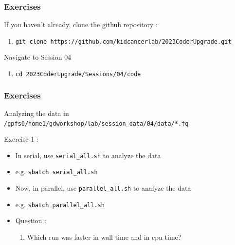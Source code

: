\documentclass{beamer}
\newcommand{\code}[1]{\colorbox{codegray}{\texttt{#1}}}
\begin{document}
%
\begin{frame}
\frametitle{Exercises}
\small
If you haven't already, clone the github repository : 
\pause
\begin{enumerate}
    \item \code{\scriptsize git clone https://github.com/kidcancerlab/2023CoderUpgrade.git}
    \pause
\end{enumerate}
Navigate to Session 04
\begin{enumerate}
    \item \code{\scriptsize cd 2023CoderUpgrade/Sessions/04/code}
\end{enumerate}
\end{frame}



\begin{frame}
\frametitle{Exercises}
\small
Analyzing the data in \code{\scriptsize /gpfs0/home1/gdworkshop/lab/session\_data/04/data/*.fq}
\bigskip

Exercise 1 : 
\begin{itemize}
        \item In serial, use \code{\scriptsize serial\_all.sh} to analyze the data
        \pause
        \item e.g. \code{\scriptsize sbatch serial\_all.sh}
        \pause
        \item Now, in parallel, use \code{\scriptsize parallel\_all.sh} to analyze the data
        \pause
        \item e.g. \code{\scriptsize sbatch parallel\_all.sh}
        \pause
        \item Question :
        \begin{enumerate}
            \item  Which run was faster in wall time and in cpu time?
        \end{enumerate}
\end{itemize}
\end{frame}
\end{document}
